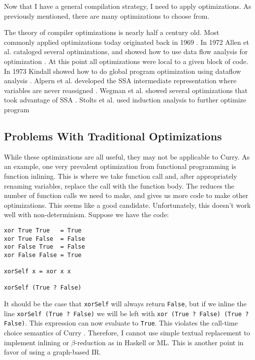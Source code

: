 Now that I have a general compilation strategy, I need to apply optimizations.
As previously mentioned, there are many optimizations to choose from.

The theory of compiler optimizations is nearly half a century old.
Most commonly applied optimizations today originated back in 1969 \cite{optminzation_allen}.
In 1972 Allen et al. cataloged several optimizations, and showed how to use data flow analysis for optimization \cite{dataflow_allen}.
At this point all optimizations were local to a given block of code.
In 1973 Kindall showed how to do global program optimization using dataflow analysis \cite{dataflow_kildall}.
Alpern et al. developed the SSA intermediate representation where variables are never reassigned \cite{ssa_alpern}.
Wegman et al. showed several optimizations that took advantage of SSA \cite{ssa_Wegman}.
Stolts et al. used induction analysis to further optimize program \cite{ssa_wolfe}

\subsection{Problems With Traditional Optimizations}
While these optimizations are all useful, they may not be applicable to Curry.
As an example, one very prevalent optimization from functional programming is function inlining.
This is where we take function call and, after appropriately renaming variables,
replace the call with the function body.
The reduces the number of function calls we need to make, and gives us more code to make other optimizations.
This seems like a good candidate.
Unfortunately, this doesn't work well with non-determinism.
Suppose we have the code:
\begin{verbatim}
xor True True   = True
xor True False  = False
xor False True  = False
xor False False = True

xorSelf x = xor x x

xorSelf (True ? False)
\end{verbatim}
It should be the case that \texttt{xorSelf} will always return \texttt{False},
but if we inline the line \texttt{xorSelf (True ? False)} we will be left with \texttt{xor (True ? False) (True ? False)}.
This expression can now evaluate to \texttt{True}.
This violates the call-time choice semantics of Curry \cite{LopezFraguas14TPLP}.
Therefore, I cannot use simple textual replacement to implement inlining or $\beta$-reduction as in Haskell or ML.
This is another point in favor of using a graph-based IR.

